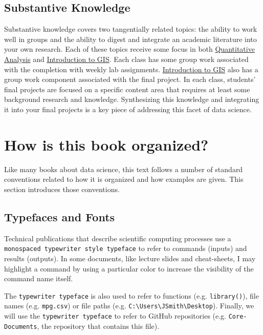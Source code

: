 \documentclass[]{book}
\theoremstyle{definition}
\theoremstyle{definition}
\theoremstyle{definition}
\theoremstyle{remark}
\begin{document}
\subsection{Substantive Knowledge}\label{substantive-knowledge}

Substantive knowledge covers two tangentially related topics: the
ability to work well in groups and the ability to digest and integrate
an academic literature into your own research. Each of these topics
receive some focus in both
\href{https://slu-soc5050.github.io}{Quantitative Analysis} and
\href{https://slu-soc5650.github.io}{Introduction to GIS}. Each class
has some group work associated with the completion with weekly lab
assignments. \href{https://slu-soc5650.github.io}{Introduction to GIS}
also has a group work component associated with the final project. In
each class, students' final projects are focused on a specific content
area that requires at least some background research and knowledge.
Synthesizing this knowledge and integrating it into your final projects
is a key piece of addressing this facet of data science.

\section{How is this book organized?}\label{how-is-this-book-organized}

Like many books about data science, this text follows a number of
standard conventions related to how it is organized and how examples are
given. This section introduces those conventions.

\subsection{Typefaces and Fonts}\label{typefaces-and-fonts}

Technical publications that describe scientific computing processes use
a \texttt{monospaced\ typewriter\ style\ typeface} to refer to commands
(inputs) and results (outputs). In some documents, like lecture slides
and cheat-sheets, I may highlight a command by using a particular color
to increase the visibility of the command name itself.

The \texttt{typewriter\ typeface} is also used to refer to functions
(e.g. \texttt{library()}), file names (e.g. \texttt{mpg.csv}) or file
paths (e.g.
\texttt{C:\textbackslash{}Users\textbackslash{}JSmith\textbackslash{}Desktop}).
Finally, we will use the \texttt{typewriter\ typeface} to refer to
GitHub repositories (e.g. \texttt{Core-Documents}, the repository that
contains this file).
\end{document}
